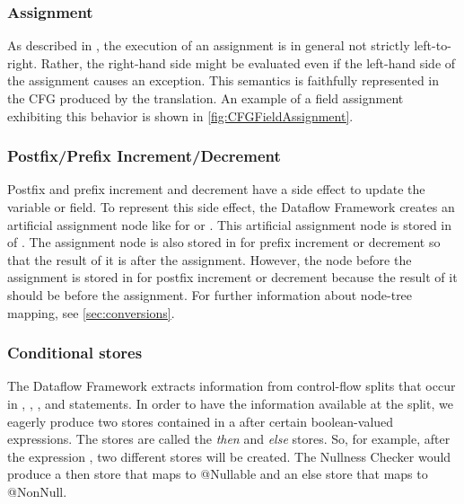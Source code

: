 \subsubsection{Assignment}

As described in , the execution of an assignment is in
general not strictly left-to-right. Rather, the right-hand side might
be evaluated even if the left-hand side of the assignment causes an
exception. This semantics is faithfully represented in the CFG
produced by the translation.  An example of a field assignment
exhibiting this behavior is shown in \autoref{fig:CFGFieldAssignment}.


\subsubsection{Postfix/Prefix Increment/Decrement}
\label{sec:postpre-incdec}
Postfix and prefix increment and decrement have a side effect to
update the variable or field. To represent this side effect, the Dataflow
Framework creates an artificial assignment node like 
for  or . This artificial assignment node is stored
in  of . The assignment
node is also stored in  for prefix increment or decrement
so that the result of it is after the assignment. However, the node before
the assignment is stored in  for postfix increment or decrement
because the result of it should be before the assignment. For further information
about node-tree mapping, see \autoref{sec:conversions}.

\subsubsection{Conditional stores}
\label{sec:cond-stores}

The Dataflow Framework extracts information from control-flow splits
that occur in , , , and  statements.  In order to have
the information available at the split, we eagerly produce two stores
contained in a  after certain
boolean-valued expressions.  The stores are called the \emph{then} and
\emph{else} stores.  So, for example, after the expression , two different stores will be created.  The Nullness Checker
would produce a then store that maps  to @Nullable and an else
store that maps  to @NonNull.

